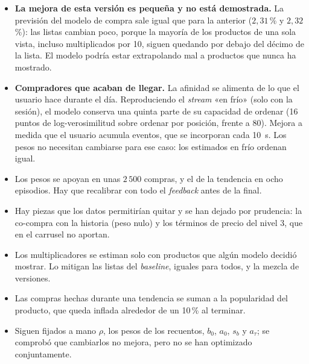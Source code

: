 \documentclass[11pt,a4paper]{article}
\begin{document}
\begin{itemize}\setlength{\itemsep}{0.15em}
\item \textbf{La mejora de esta versión es pequeña y no está demostrada.} La previsión del modelo de
compra sale igual que para la anterior ($2{,}31$\,\% y $2{,}32$\,\%): las listas cambian poco, porque la
mayoría de los productos de una sola vista, incluso multiplicados por 10, siguen quedando por debajo del
décimo de la lista. El modelo podría estar extrapolando mal a productos que nunca ha mostrado.
\item \textbf{Compradores que acaban de llegar.} La afinidad se alimenta de lo que el usuario hace durante
el día. Reproduciendo el \emph{stream} «en frío» (solo con la sesión), el modelo conserva una quinta parte
de su capacidad de ordenar (16 puntos de log-verosimilitud sobre ordenar por posición, frente a 80).
Mejora a medida que el usuario acumula eventos, que se incorporan cada 10~s. Los pesos no necesitan
cambiarse para ese caso: los estimados en frío ordenan igual.
\item Los pesos se apoyan en unas $2\,500$ compras, y el de la tendencia en ocho episodios. Hay que
recalibrar con todo el \emph{feedback} antes de la final.
\item Hay piezas que los datos permitirían quitar y se han dejado por prudencia: la co-compra con la
historia (peso nulo) y los términos de precio del nivel 3, que en el carrusel no aportan.
\item Los multiplicadores se estiman solo con productos que algún modelo decidió mostrar. Lo mitigan las
listas del \emph{baseline}, iguales para todos, y la mezcla de versiones.
\item Las compras hechas durante una tendencia se suman a la popularidad del producto, que queda inflada
alrededor de un 10\,\% al terminar.
\item Siguen fijados a mano $\rho$, los pesos de los recuentos, $b_0$, $a_0$, $s_b$ y $a_\tau$; se
comprobó que cambiarlos no mejora, pero no se han optimizado conjuntamente.
\end{itemize}
\end{document}
